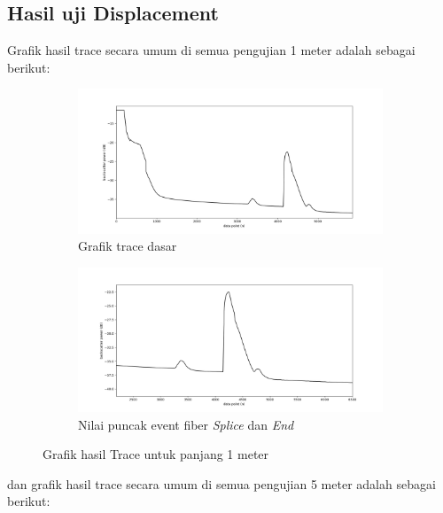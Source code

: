 \documentclass[12pt]{article}
\begin{document}
		
	\newpage
	
	\subsection{Hasil uji Displacement}
	Grafik hasil trace secara umum di semua pengujian 1 meter adalah sebagai berikut:
	
	\begin{figure}[!h]
		\centering
		\captionsetup{justification=centering}
		\begin{subfigure}[h]{0.8\textwidth}
			\includegraphics[width=\textwidth]{images/Bab_4/Bab_4_5d1}	
			\caption{\small{Grafik trace dasar}}		
		\end{subfigure}
		\begin{subfigure}[h]{0.8\textwidth}
			\includegraphics[width=\linewidth]{images/Bab_4/Bab_4_5d2}
			\caption{\small{Nilai puncak event fiber \textit{Splice} dan \textit{End}}}			
		\end{subfigure}
		\caption[Uji Pagar]{\small{Grafik hasil Trace untuk panjang 1 meter}}
	\end{figure}

	dan grafik hasil trace secara umum di semua pengujian 5 meter adalah sebagai berikut:
	
\end{document}

